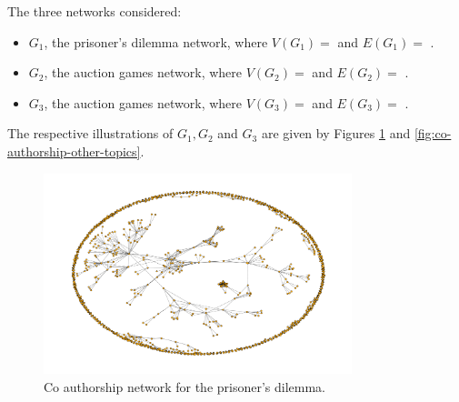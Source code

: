 \documentclass{article}
\theoremstyle{definition}
\newcommand{\authors}{}
\newcommand{\edges}{}
\newcommand{\auctionauthors}{}
\newcommand{\auctionedges}{}
\newcommand{\priceauthors}{}
\newcommand{\priceedges}{}
\begin{document}
The three networks considered:

\begin{itemize}
    \item \(G_1\), the prisoner's dilemma network, where \(V(G_1)=\) \authors and
    \(E(G_1)=\) \edges.
    \item \(G_2\), the auction games network, where \(V(G_2)=\) \auctionauthors and
    \(E(G_2)=\) \auctionedges.
    \item \(G_3\), the auction games network, where \(V(G_3)=\) \priceauthors and
    \(E(G_3)=\) \priceedges.
\end{itemize}

The respective illustrations of \(G_1, G_2\) and \(G_3\) are given by Figures
\ref{fig:authors_network} and \ref{fig:co-authorship-other-topics}.

\begin{figure}[!hbtp]
    \centering
    \includegraphics[width=0.8\textwidth]{./assets/images/co-authors-network.pdf}
    \caption{Co authorship network for the prisoner's dilemma.}\label{fig:authors_network}
\end{figure}
\end{document}

